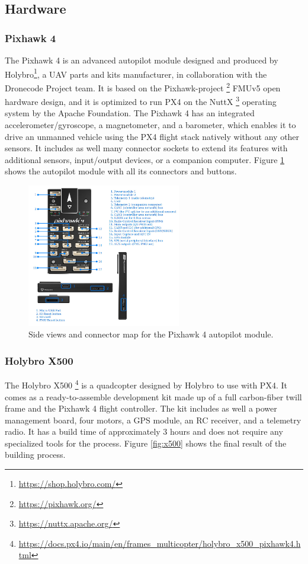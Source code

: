 \subsection{Hardware}
\subsubsection{Pixhawk 4}
\label{subsec:pixhawk}
The Pixhawk 4 is an advanced autopilot module designed and produced by Holybro\footnote{\url{https://shop.holybro.com/}}, a UAV parts and kits manufacturer, in collaboration with the Dronecode Project team.
It is based on the Pixhawk-project \footnote{\url{https://pixhawk.org/}} FMUv5 open hardware design, and it is optimized to run PX4 on the NuttX \footnote{\url{https://nuttx.apache.org/}} operating system by the Apache Foundation.
The Pixhawk 4 has an integrated accelerometer/gyroscope, a magnetometer, and a barometer, which enables it to drive an unmanned vehicle using the PX4 flight stack natively without any other sensors.
It includes as well many connector sockets to extend its features with additional sensors, input/output devices, or a companion computer.
Figure \ref{fig:pixhawk4} shows the autopilot module with all its connectors and buttons.

\begin{figure}
  \centering
  \includegraphics[width=0.6\textwidth,keepaspectratio]{img/pixhawk4.jpg}
  \caption{Side views and connector map for the Pixhawk 4 autopilot module.}
  \label{fig:pixhawk4}
\end{figure}


\subsubsection{Holybro X500}
\label{subsec:x500}
The Holybro X500 \footnote{\url{https://docs.px4.io/main/en/frames_multicopter/holybro_x500_pixhawk4.html}} is a quadcopter designed by Holybro to use with PX4.
It comes as a ready-to-assemble development kit made up of a full carbon-fiber twill frame and the Pixhawk 4 flight controller.
The kit includes as well a power management board, four motors, a GPS module, an RC receiver, and a telemetry radio.
It has a build time of approximately 3 hours and does not require any specialized tools for the process.
Figure \ref{fig:x500} shows the final result of the building process.

